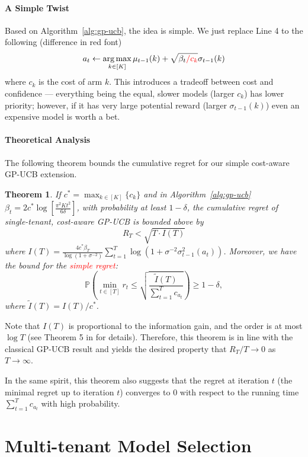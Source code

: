 \documentclass[letterpaper]{vldb}
\newtheorem{theorem}{Theorem}
\newcommand{\bP}{\mathbb{P}} %
\DeclareMathOperator*{\argmax}{arg\,max}
\begin{document}
\vspace{-0.75em}
\paragraph*{A Simple Twist} Based on Algorithm~\ref{alg:gp-ucb}, the idea is simple. 
We just replace Line 4 to the following (difference in red font)
\[
a_t \leftarrow \argmax_{k\in [K]}\mu_{t-1}(k) + \sqrt{\beta_t \textcolor{red}{/ c_k}}\sigma_{t-1}(k)
\]
where $c_k$ is the cost of arm $k$.
This introduces a tradeoff between 
cost and confidence --- everything being the equal, 
slower models (larger $c_k$) has lower priority; however,
if it has very large potential reward (larger $\sigma_{t-1}(k)$)
even an expensive model is worth a bet.

\vspace{-0.75em}
\paragraph*{Theoretical Analysis}
The following theorem bounds the cumulative regret
for our simple cost-aware GP-UCB extension.

\vspace{-0.75em}
\begin{theorem}
  \label{thm:cost}
  If $c^\ast = \max_{k\in [K]}\{c_k\}$ and
  in Algorithm~\ref{alg:gp-ucb}
  $\beta_t = 2c^\ast \log\left[\frac{\pi^2 K t^2}{6\delta}\right]$, with probability at least $1-\delta$,
  the cumulative regret of single-tenant, cost-aware GP-UCB is bounded above by
  \[
  R_T < \sqrt{T\cdot I(T)}
  \]
where $
I(T) = \frac{4c^\ast \beta_T}{\log(1 + \sigma^{-2})}\sum_{t=1}^T \log(1+\sigma^{-2}\sigma^2_{t-1}(a_t))$.
Moreover, we have the bound for the \textcolor{red}{simple regret}:
\[
    \bP\left(\min_{t\in [T]}r_t \le \sqrt{\frac{\tilde{I}(T)}{\sum_{t=1}^T
        c_{a_t}}}\right) \ge 1-\delta,
\]
where $\tilde{I}(T) = I(T)/c^\ast$.
\end{theorem}
Note that $I(T)$ is proportional to the information gain, and the order is at most $\log T$ (see Theorem 5 in \cite{SrinivasKKS10} for details). Therefore, this theorem is in line with the classical GP-UCB result and yields the desired property that $R_T/T \to 0$ as $T\to \infty$.

In the same spirit, this theorem also suggests that the regret at iteration $t$ (the minimal regret up to iteration $t$) converges to $0$ with respect to the running time $\sum_{t=1}^T c_{a_t}$ with high probability. 


\section{Multi-tenant Model Selection}\label{sec:multitenant}
\end{document}

